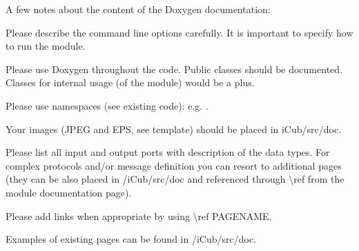 

A few notes about the content of the Doxygen documentation\+:
\begin{DoxyItemize}
\item Please describe the command line options carefully. It is important to specify how to run the module.
\item Please use Doxygen throughout the code. Public classes should be documented. Classes for internal usage (of the module) would be a plus.
\item Please use namespaces (see existing  code)\+: e.\+g. .
\item Your images (JPEG and EPS, see template) should be placed in i\+Cub/src/doc.
\item Please list all input and output ports with description of the data types. For complex protocols and/or message definition you can resort to additional pages (they can be also placed in /i\+Cub/src/doc and referenced through \textbackslash{}ref from the module documentation page).
\item Please add links when appropriate by using \textbackslash{}ref PAGENAME.
\item Examples of existing pages can be found in /i\+Cub/src/doc. 
\end{DoxyItemize}